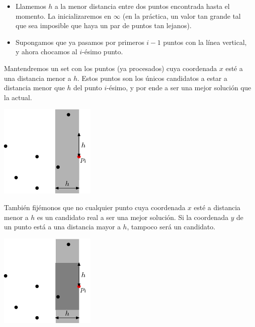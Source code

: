 \documentclass[compress]{beamer}
\begin{document}
\begin{frame}
\begin{itemize}
\item Llamemos $h$ a la menor distancia entre dos puntos encontrada hasta el momento. 
La inicializaremos en $\infty$ (en la pr\'actica, un valor tan grande tal que sea imposible que haya un par de puntos tan lejanos).

\bigskip

\item Supongamos que ya pasamos por primeros $i-1$ puntos con la l\'inea vertical, y ahora chocamos al $i$-\'esimo punto.
\end{itemize}
\end{frame}

\begin{frame}

Mantendremos un set con los puntos (ya procesados) cuya coordenada $x$ est\'e a una distancia menor a $h$. 
Estos puntos son los \'unicos candidatos a estar a distancia menor que $h$ del punto $i$-\'esimo, y por ende a ser una mejor soluci\'on que la actual. \bigskip

\begin{center}
\includegraphics[scale=0.6]{images/closest2.png}
\end{center}

\end{frame}

\begin{frame}
Tambi\'en fij\'emonos que no cualquier punto cuya coordenada $x$ est\'e a distancia menor a $h$ es un candidato real 
a ser una mejor soluci\'on. Si la coordenada $y$ de un punto est\'a a una distancia mayor a $h$, tampoco ser\'a un candidato. 

\begin{center}
\includegraphics[scale=0.6]{images/closest.png}
\end{center}

\end{frame}
\end{document}
